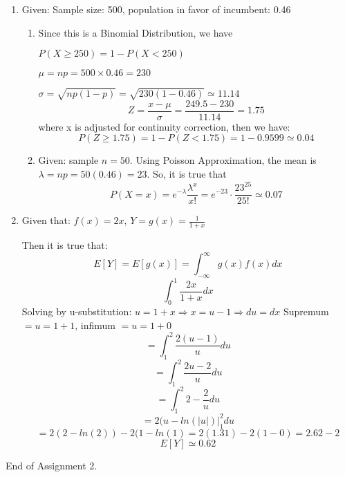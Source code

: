 \documentclass[12pt]{article}
\begin{document}
\begin{enumerate}
		\item Given: Sample size: 500, population in favor of incumbent: 0.46
			\begin{enumerate}
				\item Since this is a Binomial Distribution, we have

				$P(X \geq 250) = 1 - P(X < 250)$
				
				$\mu = np = 500 \times 0.46 = 230$
				
				$\sigma = \sqrt{np(1-p)} = \sqrt{230(1-0.46)} \simeq 11.14$
				$$Z = \frac{x - \mu}{\sigma} = \frac{249.5 - 230}{11.14} = 1.75$$
				where x is adjusted for continuity correction, then we have:
				$$P(Z \geq 1.75) = 1 - P(Z < 1.75) = 1 - 0.9599 \simeq 0.04$$
				
				\item Given: sample $n = 50$. Using Poisson Approximation, the mean is $\lambda = np = 50(0.46) = 23$. So, it is true that
				$$P(X = x) = e^{-\lambda} \frac{\lambda^x}{x!} = e^{-23} \cdot \frac{23^{25}}{25!} \simeq 0.07$$
			\end{enumerate}
			
		\item Given that: $f(x) = 2x$, $Y = g(x) = \frac{1}{1 + x}$
			
			Then it is true that:
			$$E[Y] = E[g(x)] = \int_{-\infty}^{\infty} g(x)f(x)dx$$
			$$\int_{0}^{1} \frac{2x}{1 + x}dx$$
			Solving by u-substitution: $u = 1 + x \Rightarrow x = u - 1 \Rightarrow du = dx$
			Supremum $= u = 1 + 1$, infimum $= u = 1 + 0$
			$$= \int_{1}^{2} \frac{2(u-1)}{u}du$$
			$$= \int_{1}^{2} \frac{2u-2}{u}du$$
			$$= \int_{1}^{2} 2 - \frac{2}{u}du$$
			$$= 2(u - ln(|u|)\vert_{1}^{2}du$$
			$$= 2(2 - ln(2)) - 2(1 - ln(1) = 2(1.31) - 2(1 - 0) = 2.62 - 2$$
			$$E[Y] \simeq 0.62$$
\end{enumerate}

End of Assignment 2.
\end{document}
